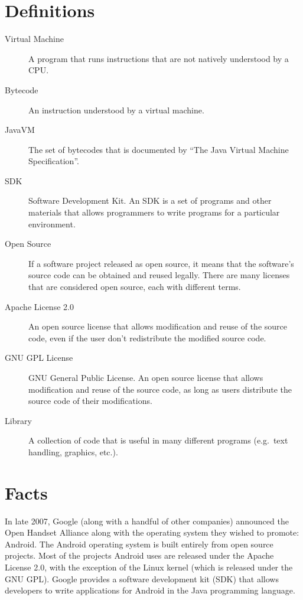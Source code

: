 \documentclass[11pt]{article}
\begin{document}
\begin{multicols}{2}
\setcounter{page}{1}

\section{Definitions} %
\label{sec:defs}

\begin{description}
    \item[Virtual Machine] A program that runs instructions that are not
    natively understood by a CPU.
    \item[Bytecode] An instruction understood by a virtual machine.
    \item[JavaVM] The set of bytecodes that is documented by ``The Java Virtual
    Machine Specification''. \cite{javavm-bytecode}
    \item[SDK] Software Development Kit.  An SDK is a set of programs and other
    materials that allows programmers to write programs for a particular
    environment.
    \item[Open Source] If a software project released as open source, it means
    that the software's source code can be obtained and reused legally.  There
    are many licenses that are considered open source, each with different
    terms.
    \item[Apache License 2.0] An open source license that allows modification
    and reuse of the source code, even if the user don't redistribute the
    modified source code. \cite{apache-license}
    \item[GNU GPL License] GNU General Public License.  An open source license
    that allows modification and reuse of the source code, as long as users
    distribute the source code of their modifications. \cite{gpl-license}
    \item[Library] A collection of code that is useful in many different
    programs (e.g.\ text handling, graphics, etc.).
\end{description}


\section{Facts} %
\label{sec:facts}

In late 2007, Google (along with a handful of other companies) announced the
Open Handset Alliance \cite{open-handset-alliance-ann} along with the operating
system they wished to promote: Android.  The Android operating system is built
entirely from open source projects.  Most of the projects Android uses are
released under the Apache License 2.0, with the exception of the Linux kernel
(which is released under the GNU GPL).  Google provides a software development
kit (SDK) that allows developers to write applications for Android in the Java
programming language.


\end{multicols}
\end{document}
